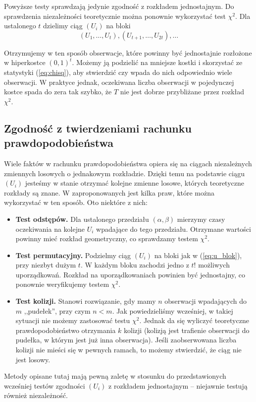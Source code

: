 \documentclass[a4paper,11pt,twoside]{book}
\theoremstyle{definition}
\begin{document}
Powyższe testy sprawdzają jedynie zgodność z rozkładem jednostajnym. Do sprawdzenia niezależności teoretycznie można ponownie wykorzystać test $\chi^2$. Dla ustalonego $t$ dzielimy ciąg $(U_i)$ na bloki 
\begin{equation}
  \label{eq:u_blok}
 (U_1,\ldots,U_t), (U_{t+1},\ldots,U_{2t}), \ldots
\end{equation}

Otrzymujemy w ten sposób obserwacje, które powinny być jednostajnie rozłożone w hiperkostce $(0,1)^t$. Możemy ją podzielić na mniejsze kostki i skorzystać ze statystyki (\ref{eq:chisq}), aby stwierdzić czy wpada do nich odpowiednio wiele obserwacji. W praktyce jednak, oczekiwana liczba obserwacji w pojedynczej kostce spada do zera tak szybko, że $T$ nie jest dobrze przybliżane przez rozkład~$\chi^2$.

\subsection*{Zgodność z twierdzeniami rachunku prawdopodobieństwa}
Wiele faktów w rachunku prawdopodobieństwa opiera się na ciągach niezależnych zmiennych losowych o jednakowym rozkładzie. Dzięki temu na podstawie ciągu $(U_i)$ jesteśmy w stanie otrzymać kolejne zmienne losowe, których teoretyczne rozkłady są znane. W \cite{knuth} zaproponowanych jest kilka praw, które można wykorzystać w ten sposób. Oto niektóre z nich:
\begin{itemize}
 \item \textbf{Test odstępów.} Dla ustalonego przedziału $(\alpha, \beta)$ mierzymy czasy oczekiwania na kolejne $U_i$ wpadające do tego przedziału. Otrzymane wartości powinny mieć rozkład geometryczny, co sprawdzamy testem $\chi^2$.
 \item \textbf{Test permutacyjny.} Podzielmy ciąg $(U_i)$ na bloki jak w (\ref{eq:u_blok}),  przy niezbyt dużym $t$. W każdym bloku zachodzi jedno z $t!$ możliwych uporządkowań. Rozkład na uporządkowaniach powinien być jednostajny, co ponownie weryfikujemy testem $\chi^2$.
 \item \textbf{Test kolizji.} Stanowi rozwiązanie, gdy mamy $n$ obserwacji wpadających do $m$ ,,pudełek'', przy czym $n < m$. Jak powiedzieliśmy wcześniej, w takiej sytuacji nie możemy zastosować testu $\chi^2$. Jednak da się wyliczyć teoretyczne prawdopodobieństwo otrzymania $k$ kolizji (kolizją jest trafienie obserwacji do pudełka, w którym jest już inna obserwacja). Jeśli zaobserwowana liczba kolizji nie mieści się w pewnych ramach, to możemy stwierdzić, że ciąg nie jest losowy.
\end{itemize}
Metody opisane tutaj mają pewną zaletę w stosunku do przedstawionych wcześniej testów zgodności $(U_i)$ z rozkładem jednostajnym -- niejawnie testują również niezależność.
\end{document}
